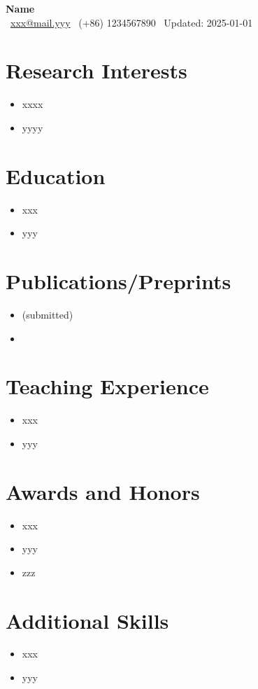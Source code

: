\documentclass{article}
\makeatletter
\newcommand{\pdf}[1]{\href{#1}{\color{red!70!black}{\faFilePdfO}}}
\renewcommand*{\author}{Name}
\renewcommand*{\Email}{xxx@mail.yyy}
\newcommand*{\phone}{(+86) 1234567890}
\makeatother
\begin{document}
\begin{center}
    {\Huge \bfseries \author}\\
    \vspace{0.5em}
    \faEnvelopeO~\href{mailto:\Email}{\Email} \quad
    {\raisebox{-0.5ex}{\Large\faMobilePhone}}~\phone \quad
    {\faClockO}~Updated: 2025-01-01
\end{center}

\section{Research Interests}
\begin{itemize}
    \item xxxx
    \item yyyy
\end{itemize}

\section{Education}

\begin{itemize}
    \item xxx
    \item yyy
\end{itemize}

\section{Publications/Preprints}

\begin{itemize}
    \item {} (submitted) \pdf{https://url-to-your-paper}
    \item {} \pdf{https://url-to-your-paper}
\end{itemize}


\section{Teaching Experience}

\begin{itemize}
    \item xxx
    \item yyy
\end{itemize}

\section{Awards and Honors}

\begin{itemize}
    \item xxx
    \item yyy
    \item zzz
\end{itemize}

\section{Additional Skills}

\begin{itemize}
    \item xxx
    \item yyy
\end{itemize}
\end{document}
